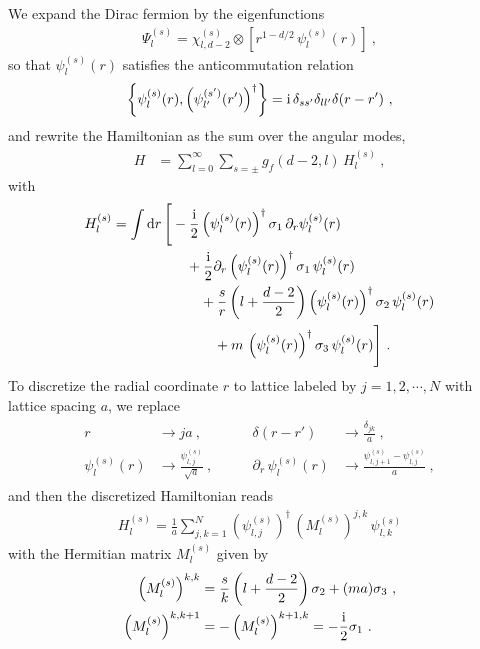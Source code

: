We expand the Dirac fermion by the eigenfunctions
\begin{align}
	\Psi_l^{(s)} =  \chi^{(s)}_{l,d-2} \otimes \left[ r^{1-d/2}\,\psi_l^{(s)}(r)\right] \ ,
\end{align}
so that $\psi_l^{(s)}(r)$ satisfies the anticommutation relation
\begin{align}
	\left\{ \psi_l^{(s)}(r), \left(\psi_{l'}^{(s')} (r')\right)^\dagger\right\} = \mathrm{i}\, \delta_{ss'}\delta_{ll'}\delta (r-r')\ ,
\end{align}
and rewrite the Hamiltonian as the sum over the angular modes,
\begin{align}
	H &= \sum_{l=0}^\infty  \sum_{s=\pm} g_f(d-2,l)\, H_{l}^{(s)} \ , 
\end{align}
with
\begin{align}
\begin{aligned}
	H_{l}^{(s)} =   \int \mathrm{d} r\, \Bigg[ &-\frac{\mathrm{i}}{2} \left(\psi_l^{(s)}(r)\right)^\dagger \sigma_1\, \partial_r \psi_l^{(s)}(r) \\
		&\quad + \frac{\mathrm{i}}{2} \partial_r \left(\psi_l^{(s)}(r)\right)^\dagger \sigma_1\,  \psi_l^{(s)}(r) \\
	&\qquad +  \frac{s}{r} \left( l + \frac{d-2}{2}\right) \left(\psi_l^{(s)}(r)\right)^\dagger  \sigma_2\, \psi_l^{(s)}(r) \\
	&\qquad\quad + m\, \left(\psi_l^{(s)}(r)\right)^\dagger \sigma_3\,  \psi_l^{(s)}(r) \Bigg]   \ .
\end{aligned}
\end{align}
To discretize the radial coordinate $r$ to lattice labeled by $j=1,2,\cdots, N$ with lattice spacing $a$, we replace 
\begin{align}
	\begin{aligned}
		r &\to j a \ , \qquad &  \delta (r - r') &\to \frac{\delta_{jk}}{a} \ , \\
		\psi_l^{(s)}(r) &\to \frac{ \psi^{(s)}_{l,j} }{\sqrt{a}}\ , \qquad & \partial_r\, \psi_l^{(s)} (r) &\to \frac{\psi^{(s)}_{l,j+1} - \psi^{(s)}_{l,j}}{a}  \ , 
	\end{aligned}
\end{align}
and then the discretized Hamiltonian reads
\begin{align}
	H_l^{(s)} = \frac{1}{a}\sum_{j,k=1}^N \left(\psi^{(s)}_{l,j}\right)^\dagger \, \left(M_l^{(s)}\right)^{j,k} \,\psi^{(s)}_{l,k} 
\end{align}
with the Hermitian matrix $M_l^{(s)}$ given by
\begin{align}\label{HermFermiM}
	\begin{aligned}
		\left(M_l^{(s)}\right)^{k,k} &= \frac{s}{k} \left( l + \frac{d-2}{2}\right) \sigma_2  + (ma)\sigma_3 \ , \\
		\left(M_l^{(s)}\right)^{k,k+1} &= - \left(M_l^{(s)}\right)^{k+1, k} = - \frac{\mathrm{i}}{2}\sigma_1 \ .
	\end{aligned}
\end{align}

